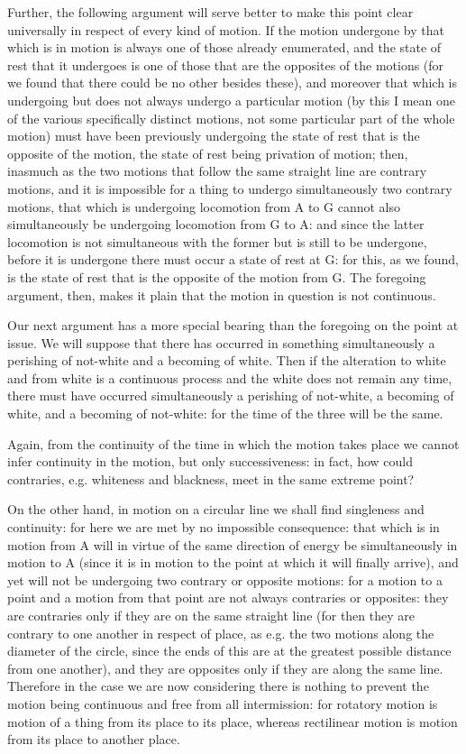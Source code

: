 Further, the following argument will serve better to make this point
clear universally in respect of every kind of motion. If the motion
undergone by that which is in motion is always one of those already
enumerated, and the state of rest that it undergoes is one of those
that are the opposites of the motions (for we found that there could
be no other besides these), and moreover that which is undergoing
but does not always undergo a particular motion (by this I mean one
of the various specifically distinct motions, not some particular
part of the whole motion) must have been previously undergoing the
state of rest that is the opposite of the motion, the state of rest
being privation of motion; then, inasmuch as the two motions that
follow the same straight line are contrary motions, and it is impossible
for a thing to undergo simultaneously two contrary motions, that which
is undergoing locomotion from A to G cannot also simultaneously be
undergoing locomotion from G to A: and since the latter locomotion
is not simultaneous with the former but is still to be undergone,
before it is undergone there must occur a state of rest at G: for
this, as we found, is the state of rest that is the opposite of the
motion from G. The foregoing argument, then, makes it plain that the
motion in question is not continuous. 

Our next argument has a more special bearing than the foregoing on
the point at issue. We will suppose that there has occurred in something
simultaneously a perishing of not-white and a becoming of white. Then
if the alteration to white and from white is a continuous process
and the white does not remain any time, there must have occurred simultaneously
a perishing of not-white, a becoming of white, and a becoming of not-white:
for the time of the three will be the same. 

Again, from the continuity of the time in which the motion takes place
we cannot infer continuity in the motion, but only successiveness:
in fact, how could contraries, e.g. whiteness and blackness, meet
in the same extreme point? 

On the other hand, in motion on a circular line we shall find singleness
and continuity: for here we are met by no impossible consequence:
that which is in motion from A will in virtue of the same direction
of energy be simultaneously in motion to A (since it is in motion
to the point at which it will finally arrive), and yet will not be
undergoing two contrary or opposite motions: for a motion to a point
and a motion from that point are not always contraries or opposites:
they are contraries only if they are on the same straight line (for
then they are contrary to one another in respect of place, as e.g.
the two motions along the diameter of the circle, since the ends of
this are at the greatest possible distance from one another), and
they are opposites only if they are along the same line. Therefore
in the case we are now considering there is nothing to prevent the
motion being continuous and free from all intermission: for rotatory
motion is motion of a thing from its place to its place, whereas rectilinear
motion is motion from its place to another place. 

